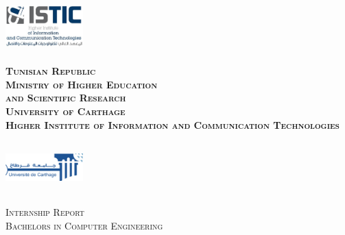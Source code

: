 \begin{titlepage}

\newcommand{\HRule}{\rule{\linewidth}{0.5mm}} %

\center %
 


\begin{minipage}[l]{0.2\columnwidth}
\includegraphics[width=3cm,height=2cm]{logo_istic.jpg}\\
\end{minipage}
\hfill
\begin{minipage}[l]{0.5\columnwidth}
\centering
\footnotesize
\textbf{\textsc{Tunisian Republic}}\\
\textbf{\textsc{Ministry of Higher Education\\
and Scientific Research}}\\
\medskip 
\textbf{\textsc{University of Carthage}}\\
\medskip 
\textbf{\textsc{Higher Institute of Information and Communication Technologies}}
\end{minipage}
\hfill
\begin{minipage}[l]{0.2\columnwidth}
\includegraphics[width=3cm,height=2cm]{universite-carthage.png}\\
\end{minipage}

\vskip2cm
\textsc{ \huge Internship Report}\\[0.5cm] %


\textsc{\large Bachelors in Computer Engineering}\\[0.5 cm] %


\end{titlepage}
